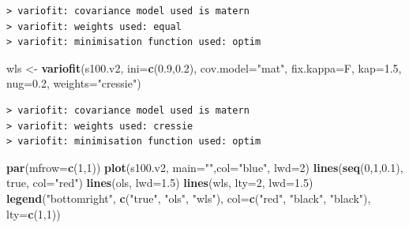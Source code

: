 \documentclass[b5paper,]{book}
\makeatletter
\newenvironment{Shaded}{\begin{snugshade}}{\end{snugshade}}
\newcommand{\KeywordTok}[1]{\textcolor[rgb]{0.13,0.29,0.53}{\textbf{{#1}}}}
\newcommand{\DataTypeTok}[1]{\textcolor[rgb]{0.13,0.29,0.53}{{#1}}}
\newcommand{\DecValTok}[1]{\textcolor[rgb]{0.00,0.00,0.81}{{#1}}}
\newcommand{\FloatTok}[1]{\textcolor[rgb]{0.00,0.00,0.81}{{#1}}}
\newcommand{\StringTok}[1]{\textcolor[rgb]{0.31,0.60,0.02}{{#1}}}
\newcommand{\NormalTok}[1]{{#1}}
\newenvironment{kframe}{%
\medskip{}
\setlength{\fboxsep}{.8em}
 \def\at@end@of@kframe{}%
 \ifinner\ifhmode%
  \def\at@end@of@kframe{\end{minipage}}%
  \begin{minipage}{\columnwidth}%
 \fi\fi%
 \def\FrameCommand##1{\hskip\@totalleftmargin \hskip-\fboxsep
 \colorbox{shadecolor}{##1}\hskip-\fboxsep
     \hskip-\linewidth \hskip-\@totalleftmargin \hskip\columnwidth}%
 \MakeFramed {\advance\hsize-\width
   \@totalleftmargin\z@ \linewidth\hsize
   \@setminipage}}%
 {\par\unskip\endMakeFramed%
 \at@end@of@kframe}
\renewenvironment{Shaded}{\begin{kframe}}{\end{kframe}}
\theoremstyle{definition}
\theoremstyle{definition}
\theoremstyle{definition}
\theoremstyle{remark}
\makeatother
\begin{document}
\begin{verbatim}
> variofit: covariance model used is matern 
> variofit: weights used: equal 
> variofit: minimisation function used: optim
\end{verbatim}

\begin{Shaded}
\begin{Highlighting}[]
\NormalTok{wls <-}\StringTok{ }\KeywordTok{variofit}\NormalTok{(s100.v2, }\DataTypeTok{ini=}\KeywordTok{c}\NormalTok{(}\FloatTok{0.9}\NormalTok{,}\FloatTok{0.2}\NormalTok{), }\DataTypeTok{cov.model=}\StringTok{"mat"}\NormalTok{,}
                \DataTypeTok{fix.kappa=}\NormalTok{F, }\DataTypeTok{kap=}\FloatTok{1.5}\NormalTok{, }\DataTypeTok{nug=}\FloatTok{0.2}\NormalTok{, }\DataTypeTok{weights=}\StringTok{"cressie"}\NormalTok{)}
\end{Highlighting}
\end{Shaded}

\begin{verbatim}
> variofit: covariance model used is matern 
> variofit: weights used: cressie 
> variofit: minimisation function used: optim
\end{verbatim}

\begin{Shaded}
\begin{Highlighting}[]
\KeywordTok{par}\NormalTok{(}\DataTypeTok{mfrow=}\KeywordTok{c}\NormalTok{(}\DecValTok{1}\NormalTok{,}\DecValTok{1}\NormalTok{))}
\KeywordTok{plot}\NormalTok{(s100.v2, }\DataTypeTok{main=}\StringTok{""}\NormalTok{,}\DataTypeTok{col=}\StringTok{"blue"}\NormalTok{, }\DataTypeTok{lwd=}\DecValTok{2}\NormalTok{)}
\KeywordTok{lines}\NormalTok{(}\KeywordTok{seq}\NormalTok{(}\DecValTok{0}\NormalTok{,}\DecValTok{1}\NormalTok{,}\FloatTok{0.1}\NormalTok{), true, }\DataTypeTok{col=}\StringTok{"red"}\NormalTok{)}
\KeywordTok{lines}\NormalTok{(ols, }\DataTypeTok{lwd=}\FloatTok{1.5}\NormalTok{)}
\KeywordTok{lines}\NormalTok{(wls, }\DataTypeTok{lty=}\DecValTok{2}\NormalTok{, }\DataTypeTok{lwd=}\FloatTok{1.5}\NormalTok{)}
\KeywordTok{legend}\NormalTok{(}\StringTok{"bottomright"}\NormalTok{, }\KeywordTok{c}\NormalTok{(}\StringTok{"true"}\NormalTok{, }\StringTok{"ols"}\NormalTok{, }\StringTok{"wls"}\NormalTok{),}
       \DataTypeTok{col=}\KeywordTok{c}\NormalTok{(}\StringTok{"red"}\NormalTok{, }\StringTok{"black"}\NormalTok{, }\StringTok{"black"}\NormalTok{), }\DataTypeTok{lty=}\KeywordTok{c}\NormalTok{(}\DecValTok{1}\NormalTok{,}\DecValTok{1}\NormalTok{))}
\end{Highlighting}
\end{Shaded}
\end{document}
